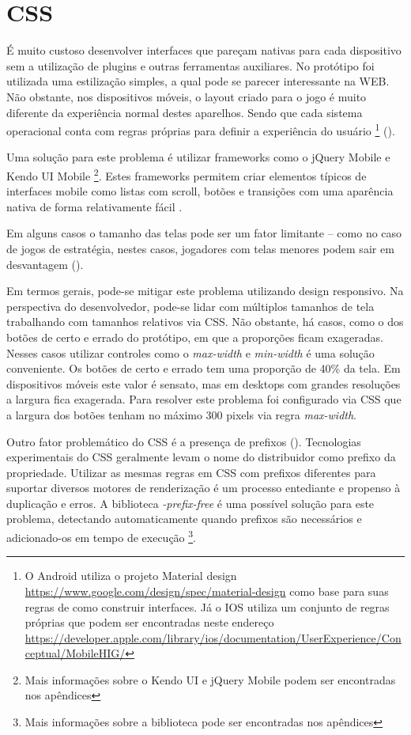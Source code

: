 \section{CSS}

É muito custoso desenvolver interfaces que pareçam nativas para
cada dispositivo sem a utilização de plugins e outras ferramentas auxiliares. No
protótipo foi utilizada uma estilização simples, a qual pode se
parecer interessante na WEB. Não obstante, nos dispositivos móveis,
o layout criado para o jogo é muito diferente da experiência normal
destes aparelhos. Sendo que cada sistema operacional conta com regras
próprias para definir a experiência do usuário \footnote{
    O Android utiliza o projeto Material design \url{https://www.google.com/design/spec/material-design} como base para suas 
    regras de como construir interfaces.  Já o IOS utiliza um conjunto 
    de regras próprias que podem ser encontradas neste endereço \url{https://developer.apple.com/library/ios/documentation/UserExperience/Conceptual/MobileHIG/}
} ().

Uma solução para este problema é utilizar frameworks como o jQuery
Mobile e Kendo UI Mobile \footnote{Mais informações sobre o Kendo UI
e jQuery Mobile podem ser encontradas nos apêndices}. Estes frameworks
permitem criar elementos típicos de interfaces mobile como listas
com scroll, botões e transições com uma aparência nativa de forma
relativamente fácil \autocite{publishHtml5}.

Em alguns casos o tamanho das telas pode ser um fator
limitante – como no caso de jogos de estratégia, nestes
casos, jogadores com telas menores podem sair em desvantagem
().

Em termos gerais, pode-se mitigar este problema utilizando design
responsivo. Na perspectiva do desenvolvedor, pode-se lidar com
múltiplos tamanhos de tela trabalhando com tamanhos relativos via
CSS. Não obstante, há casos, como o dos botões de certo e errado
do protótipo, em que a proporções ficam exageradas. Nesses casos
utilizar controles como o \textit{max-width} e \textit{min-width} é uma
solução conveniente. Os botões de certo e errado tem uma proporção
de 40\% da tela. Em dispositivos móveis este valor é sensato, mas
em desktops com grandes resoluções a largura fica exagerada. Para
resolver este problema foi configurado via CSS que a largura dos botões
tenham no máximo 300 pixels via regra \textit{max-width}.

Outro fator problemático do CSS é a presença de prefixos
(). Tecnologias experimentais do CSS geralmente
levam o nome do distribuidor como prefixo da propriedade. Utilizar as
mesmas regras em CSS com prefixos diferentes para suportar diversos
motores de renderização é um processo entediante e propenso à
duplicação e erros. A biblioteca \textit{-prefix-free} é uma
possível solução para este problema, detectando automaticamente
quando prefixos são necessários e adicionado-os em tempo de execução
\footnote{Mais informações sobre a biblioteca pode ser encontradas nos
apêndices}.

